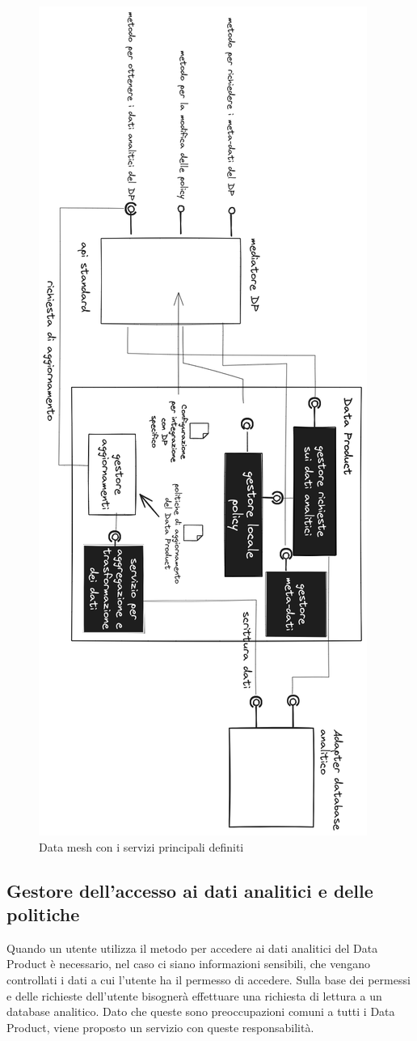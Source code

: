 \documentclass[12pt]{report}
\begin{document}
\begin{figure}
    \centering
    \includegraphics[width=0.5\linewidth]{immagini/Data Mesh supporto agli aggiornamenti 2024-03-08 15.55.58.excalidraw.png}
    \caption{Data mesh con i servizi principali definiti}
    \label{fig:dp supporto aggiornamenti}
\end{figure}

\subsection{Gestore dell'accesso ai dati analitici e delle politiche}
Quando un utente utilizza il metodo per accedere ai dati analitici del Data Product è necessario, nel caso ci siano informazioni sensibili, che vengano controllati i dati a cui l'utente ha il permesso di accedere.
Sulla base dei permessi e delle richieste dell'utente bisognerà effettuare una richiesta di lettura a un database analitico.
Dato che queste sono preoccupazioni comuni a tutti i Data Product, viene proposto un servizio con queste responsabilità.
\end{document}
